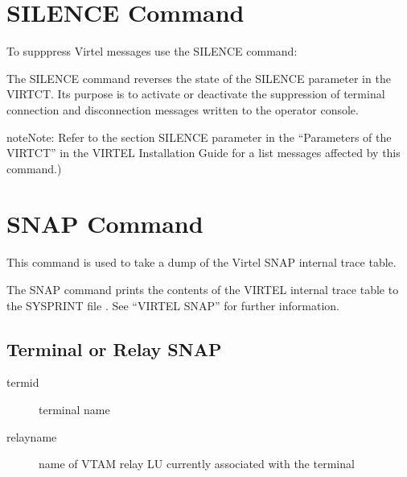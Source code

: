 \documentclass[letterpaper,10pt,english]{sphinxmanual}
\begin{document}
\newpage


\section{SILENCE Command}
\label{\detokenize{audit_operations_ and_performance:silence-command}}\label{\detokenize{audit_operations_ and_performance:index-18}}
To supppress Virtel messages use the SILENCE command:

\begin{sphinxVerbatim}[commandchars=\\\{\}]
\end{sphinxVerbatim}

The SILENCE command reverses the state of the SILENCE parameter in the VIRTCT. Its purpose is to activate or deactivate the suppression of terminal connection and disconnection messages written to the operator console.

\begin{sphinxadmonition}{note}{Note:}
Refer to the section SILENCE parameter in the “Parameters of the VIRTCT” in the VIRTEL Installation Guide for a list messages affected by this command.)
\end{sphinxadmonition}


\section{SNAP Command}
\label{\detokenize{audit_operations_ and_performance:snap-command}}\label{\detokenize{audit_operations_ and_performance:index-19}}
This command is used to take a dump of the Virtel SNAP internal trace table.

\begin{sphinxVerbatim}[commandchars=\\\{\}]
\end{sphinxVerbatim}

The SNAP command prints the contents of the VIRTEL internal trace table to the SYSPRINT file . See “VIRTEL SNAP” for further information.


\subsection{Terminal or Relay SNAP}
\label{\detokenize{audit_operations_ and_performance:terminal-or-relay-snap}}
\begin{sphinxVerbatim}[commandchars=\\\{\}]
  
\end{sphinxVerbatim}
\begin{description}
\item[{termid}] \leavevmode
terminal name

\item[{relayname}] \leavevmode
name of VTAM relay LU currently associated with the terminal

\end{description}
\end{document}
